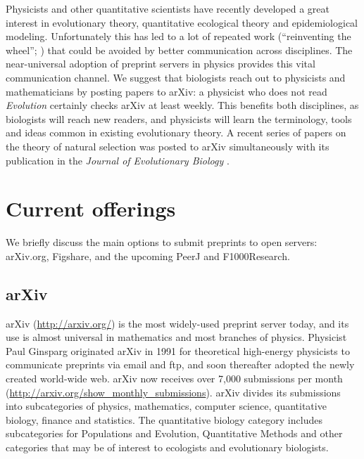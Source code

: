 \documentclass[letterpaper,twocolumn,superscriptaddress,showkeys]{revtex4}
\begin{document}
Physicists and other quantitative scientists have recently developed a
great interest in evolutionary theory, quantitative ecological theory
and epidemiological modeling.  Unfortunately this has led to a lot of
repeated work (``reinventing the wheel''; \cite{de2011contribution})
that could be avoided by better communication across disciplines.  The
near-universal adoption of preprint servers in physics provides this
vital communication channel.  We suggest that biologists reach out to
physicists and mathematicians by posting papers to arXiv: a physicist
who does not read \emph{Evolution} certainly checks arXiv at least
weekly.  This benefits both disciplines, as biologists will reach new
readers, and physicists will learn the terminology, tools and ideas
common in existing evolutionary theory.  A recent series of papers on
the theory of natural selection was posted to arXiv simultaneously
with its publication in the \emph{Journal of Evolutionary Biology}
\cite{JEB:JEB2431,JEB:JEB2498,JEB:JEB2378,JEB:JEB2373}.

\section{Current offerings}

We briefly discuss the main options to submit preprints to open servers:
arXiv.org, Figshare, and the upcoming PeerJ and F1000Research.

\subsection{arXiv}

%

arXiv (\url{http://arxiv.org/}) is the most widely-used preprint server today,
and its use is almost universal in mathematics and most branches of physics.
Physicist Paul Ginsparg originated arXiv in 1991 for theoretical high-energy
physicists to communicate preprints via email and ftp, and soon thereafter
adopted the newly created world-wide web\cite{jackson2002preprints}.  arXiv now
receives over 7,000 submissions per month
(\url{http://arxiv.org/show_monthly_submissions}).  arXiv divides its
submissions into subcategories of physics, mathematics, computer science,
quantitative biology, finance and statistics.  The quantitative biology category
includes subcategories for Populations and Evolution, Quantitative Methods and
other categories that may be of interest to ecologists and evolutionary
biologists.
\end{document}
